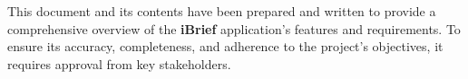 This document and its contents have been prepared and written to provide a comprehensive overview of the \textbf{iBrief} application's features and requirements. To ensure its accuracy, completeness, and adherence to the project's objectives, it requires approval from key stakeholders.
